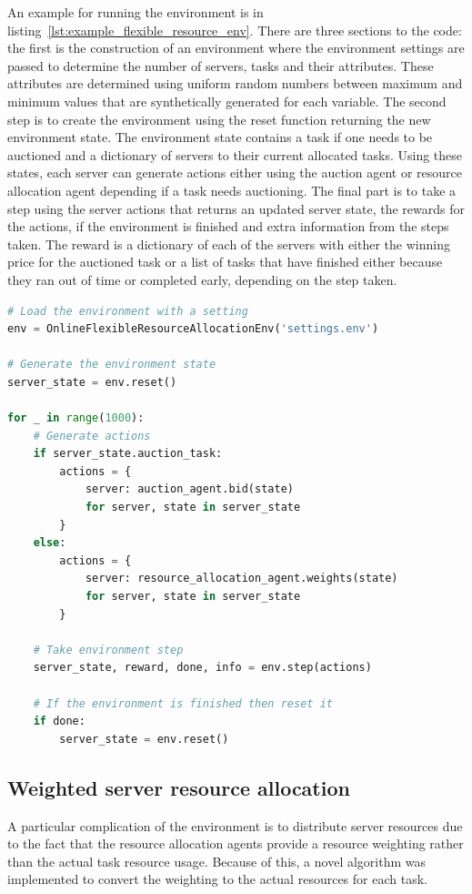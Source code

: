 An example for running the environment is in listing~\ref{lst:example_flexible_resource_env}. There are three
sections to the code: the first is the construction of an environment where the environment settings
are passed to determine the number of servers, tasks and their attributes. These attributes are determined using
uniform random numbers between maximum and minimum values that are synthetically generated for each variable. The
second step is to create the environment using the reset function returning the new environment state. The environment
state contains a task if one needs to be auctioned and a dictionary of servers to their current allocated tasks. Using these
states, each server can generate actions either using the auction agent or resource allocation agent depending if a task
needs auctioning. The final part is to take a step using the server actions that returns an updated server state, the
rewards for the actions, if the environment is finished and extra information from the steps taken. The reward is a
dictionary of each of the servers with either the winning price for the auctioned task or a list of tasks that have
finished either because they ran out of time or completed early, depending on the step taken.

\begin{lstlisting}[language=Python, frame=single, caption={Example code for running the environment}, captionpos=b, label={lst:example_flexible_resource_env}]
# Load the environment with a setting
env = OnlineFlexibleResourceAllocationEnv('settings.env')

# Generate the environment state
server_state = env.reset()

for _ in range(1000):
    # Generate actions
    if server_state.auction_task:
        actions = {
            server: auction_agent.bid(state)
            for server, state in server_state
        }
    else:
        actions = {
            server: resource_allocation_agent.weights(state)
            for server, state in server_state
        }

    # Take environment step
    server_state, reward, done, info = env.step(actions)

    # If the environment is finished then reset it
    if done:
        server_state = env.reset()
\end{lstlisting}

\subsection{Weighted server resource allocation}\label{subsec:weighted-server-resource-allocation}
A particular complication of the environment is to distribute server resources due to the fact that the resource
allocation agents provide a resource weighting rather than the actual task resource usage. Because of this, a novel
algorithm was implemented to convert the weighting to the actual resources for each task.

